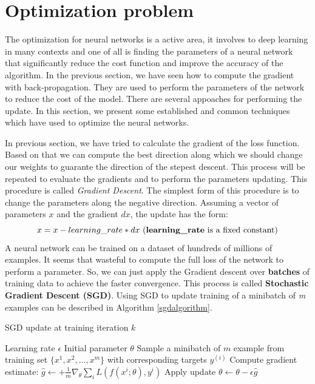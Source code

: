 \section{Optimization problem}
The optimization for neural networks is a active area, it involves to deep learning in many contexts and one of all is finding the parameters of a neural network that significantly reduce the cost function and improve the accuracy of the algorithm. In the previous section, we have seen how to compute the gradient with back-propagation. They are used to perform the parameters of the network to reduce the cost of the model. There are several appoaches for performing the update. In this section, we present some established and common techniques which have used to optimize the neural networks.

In previous section, we have tried to calculate the gradient of the loss function. Based on that we can compute the best direction along which we should change our weights to guarante the direction of the stepest descent. This process will be repeated to evaluate the gradients and to perform the parameters updating. This procedure is called \textit{Gradient Descent}. The simplest form of this procedure is to change the parameters along the negative direction. Assuming a vector of parameters \textbf{$x$} and the gradient \textbf{$dx$}, the update has the form: 
\begin{equation}
	x = x - learning\_rate \ast dx \text{ (\textbf{learning\_rate} is a fixed constant)}
\end{equation}
A neural network can be trained on a dataset of hundreds of millions of examples. It seems that wasteful to compute the full loss of the network to perform a parameter. So, we can just apply the Gradient descent over \textbf{batches} of training data to achieve the faster convergence. This process is called \textbf{Stochastic Gradient Descent (SGD)}. Using SGD to update training of a minibatch of \textit{m} examples can be described in  Algorithm \ref{sgdalgorithm}.
\begin{algorithm}
	\caption{SGD update at training iteration $k$}
	\label{sgdalgorithm}
	\begin{algorithmic}
		\REQUIRE Learning rate $\epsilon$
		\REQUIRE Initial parameter $\theta$
			\STATE Sample a minibatch of $m$ example from training set $\{ x^1,x^2,\ldots, x^m \}$ with corresponding targets $y^{(i)}$
			\STATE Compute gradient estimate: $\hat{g} \leftarrow + \frac{1}{m} \nabla_\theta \sum_i L(f(x^i;\theta), y^i) $
			\STATE Apply update $\theta \leftarrow \theta - \epsilon \hat{g}$
		\ENDWHILE
	\end{algorithmic}
\end{algorithm}

